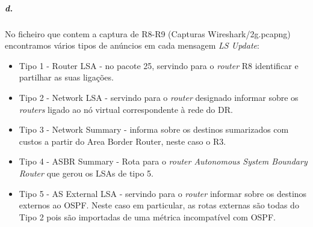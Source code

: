 \newpage

\subparagraph{d.}

No ficheiro que contem a captura de \textsf{R8-R9} (Capturas Wireshark/2g.pcapng) encontramos vários
tipos de anúncios em cada mensagem \emph{LS Update}:
\begin{itemize}
  \item Tipo 1 - Router LSA - no pacote 25, servindo para o \emph{router} \textsf{R8}
    identificar e partilhar as suas ligações.
  \item Tipo 2 - Network LSA - servindo para o \emph{router} designado informar
    sobre os \emph{routers} ligado ao nó virtual correspondente à rede
    do DR.
  \item Tipo 3 - Network Summary - informa sobre os destinos
    sumarizados com custos a partir do Area Border Router, neste caso
    o R3.
  \item Tipo 4 - ASBR Summary - Rota para o \emph{router Autonomous System Boundary
    Router} que gerou os LSAs de tipo 5.
  \item Tipo 5 - AS External LSA - servindo para o \emph{router}
    informar sobre os destinos externos ao OSPF. Neste caso em
    particular, as rotas externas são todas do Tipo 2 pois são
    importadas de uma métrica incompatível com OSPF.
\end{itemize}

